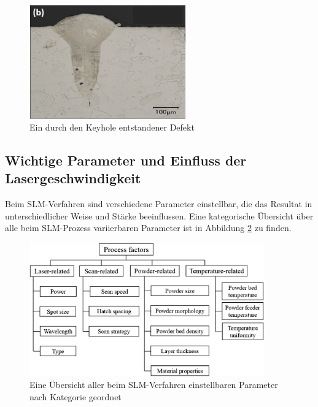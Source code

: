 		\begin{figure}[!ht]
			\centering
			\includegraphics[width=0.6\textwidth]{chapter/main/theory/img/defects/keyhole.png}
			\caption{Ein durch den Keyhole entstandener Defekt \cite{eskandarisabzi2019defect}}
			\label{fig:defects_keyholes}
		\end{figure}

	\subsection{Wichtige Parameter und Einfluss der Lasergeschwindigkeit}
		Beim SLM-Verfahren sind verschiedene Parameter einstellbar, die das Resultat in
		unterschiedlicher Weise und Stärke beeinflussen. Eine kategorische Übersicht über alle
		beim SLM-Prozess variierbaren Parameter ist in Abbildung \ref{fig:scheme_parameters} zu
		finden.

		\begin{figure}[!ht]
			\centering
			\includegraphics[width=0.9\textwidth]{chapter/main/theory/img/scheme_parameters_2.png}
			\caption{Eine Übersicht aller beim SLM-Verfahren einstellbaren Parameter nach
			Kategorie geordnet \cite{zhang2017defect,aboulkhair2014reducing}}
			\label{fig:scheme_parameters}
		\end{figure}

